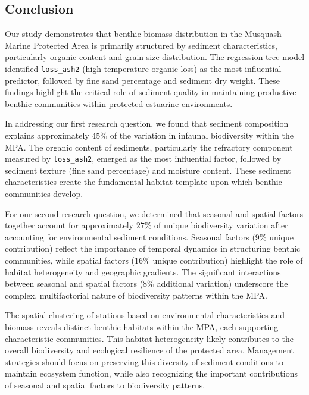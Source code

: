 \documentclass[12pt]{article}
\begin{document}
\subsection{Conclusion}

\qquad Our study demonstrates that benthic biomass distribution in the Musquash Marine Protected Area is primarily structured by sediment characteristics, particularly organic content and grain size distribution. The regression tree model identified \texttt{loss\_ash2} (high-temperature organic loss) as the most influential predictor, followed by fine sand percentage and sediment dry weight. These findings highlight the critical role of sediment quality in maintaining productive benthic communities within protected estuarine environments.

\qquad In addressing our first research question, we found that sediment composition explains approximately $45\%$ of the variation in infaunal biodiversity within the MPA. The organic content of sediments, particularly the refractory component measured by \texttt{loss\_ash2}, emerged as the most influential factor, followed by sediment texture (fine sand percentage) and moisture content. These sediment characteristics create the fundamental habitat template upon which benthic communities develop.

\qquad For our second research question, we determined that seasonal and spatial factors together account for approximately $27\%$ of unique biodiversity variation after accounting for environmental sediment conditions. Seasonal factors ($9\%$ unique contribution) reflect the importance of temporal dynamics in structuring benthic communities, while spatial factors ($16\%$ unique contribution) highlight the role of habitat heterogeneity and geographic gradients. The significant interactions between seasonal and spatial factors ($8\%$ additional variation) underscore the complex, multifactorial nature of biodiversity patterns within the MPA.

\qquad The spatial clustering of stations based on environmental characteristics and biomass reveals distinct benthic habitats within the MPA, each supporting characteristic communities. This habitat heterogeneity likely contributes to the overall biodiversity and ecological resilience of the protected area. Management strategies should focus on preserving this diversity of sediment conditions to maintain ecosystem function, while also recognizing the important contributions of seasonal and spatial factors to biodiversity patterns.
\end{document}
